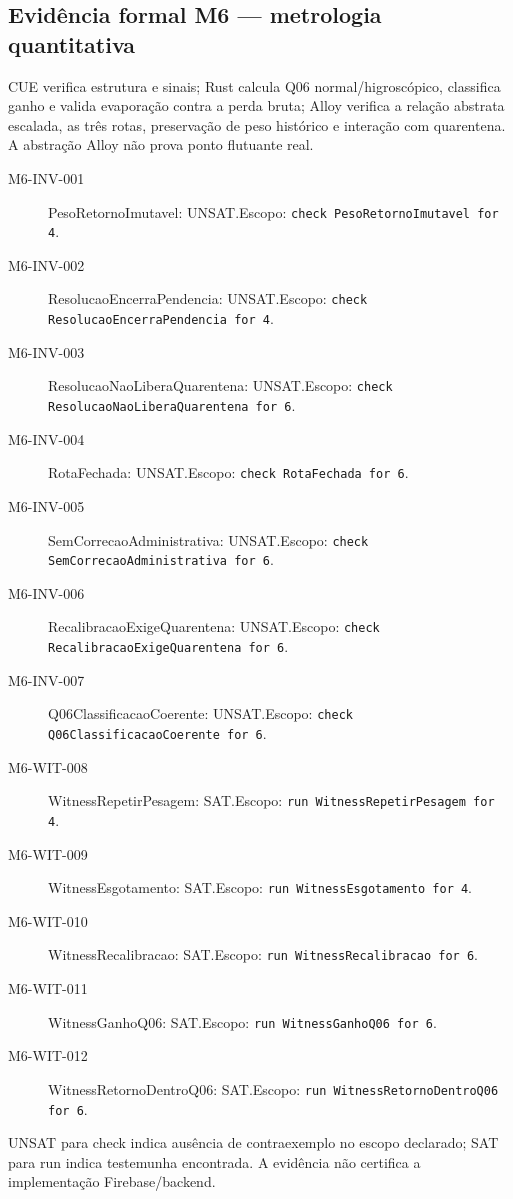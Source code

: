 \subsection*{Evidência formal M6 --- metrologia quantitativa}
CUE verifica estrutura e sinais; Rust calcula Q06 normal/higroscópico, classifica ganho e valida evaporação contra a perda bruta; Alloy verifica a relação abstrata escalada, as três rotas, preservação de peso histórico e interação com quarentena. A abstração Alloy não prova ponto flutuante real.
\begin{description}
\item[M6-INV-001] PesoRetornoImutavel: UNSAT.\newline Escopo: \texttt{check PesoRetornoImutavel for 4}.
\item[M6-INV-002] ResolucaoEncerraPendencia: UNSAT.\newline Escopo: \texttt{check ResolucaoEncerraPendencia for 4}.
\item[M6-INV-003] ResolucaoNaoLiberaQuarentena: UNSAT.\newline Escopo: \texttt{check ResolucaoNaoLiberaQuarentena for 6}.
\item[M6-INV-004] RotaFechada: UNSAT.\newline Escopo: \texttt{check RotaFechada for 6}.
\item[M6-INV-005] SemCorrecaoAdministrativa: UNSAT.\newline Escopo: \texttt{check SemCorrecaoAdministrativa for 6}.
\item[M6-INV-006] RecalibracaoExigeQuarentena: UNSAT.\newline Escopo: \texttt{check RecalibracaoExigeQuarentena for 6}.
\item[M6-INV-007] Q06ClassificacaoCoerente: UNSAT.\newline Escopo: \texttt{check Q06ClassificacaoCoerente for 6}.
\item[M6-WIT-008] WitnessRepetirPesagem: SAT.\newline Escopo: \texttt{run WitnessRepetirPesagem for 4}.
\item[M6-WIT-009] WitnessEsgotamento: SAT.\newline Escopo: \texttt{run WitnessEsgotamento for 4}.
\item[M6-WIT-010] WitnessRecalibracao: SAT.\newline Escopo: \texttt{run WitnessRecalibracao for 6}.
\item[M6-WIT-011] WitnessGanhoQ06: SAT.\newline Escopo: \texttt{run WitnessGanhoQ06 for 6}.
\item[M6-WIT-012] WitnessRetornoDentroQ06: SAT.\newline Escopo: \texttt{run WitnessRetornoDentroQ06 for 6}.
\end{description}
UNSAT para check indica ausência de contraexemplo no escopo declarado; SAT para run indica testemunha encontrada. A evidência não certifica a implementação Firebase/backend.
